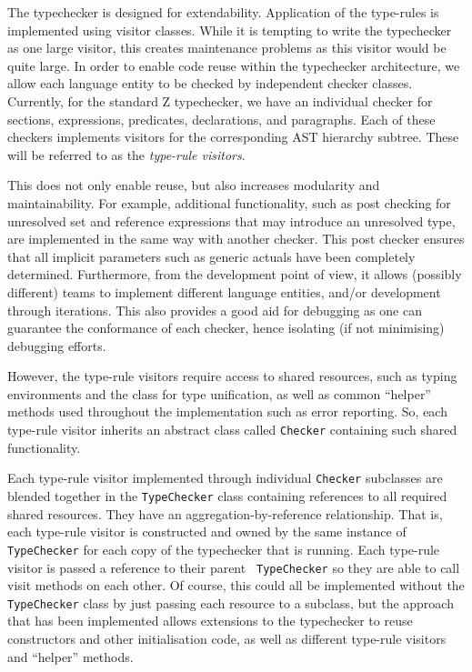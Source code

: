 \documentclass{llncs}
\begin{document}
The typechecker is designed for extendability. Application of the type-rules
is implemented using visitor classes. While it is tempting to
write the typechecker as one large visitor, this creates maintenance
problems as this visitor would be quite large.  In order to enable
code reuse within the typechecker architecture, we allow each language
entity to be checked by independent checker classes.  Currently, for
the standard Z typechecker, we have an individual checker for
sections, expressions, predicates, declarations, and paragraphs. Each
of these checkers implements visitors for the corresponding AST hierarchy
subtree.  These will be referred to as the {\em type-rule visitors}.

This does not only enable reuse, but also increases modularity and
maintainability.  For example, additional functionality, such as post
checking for unresolved set and reference expressions that may
introduce an unresolved type, are implemented in the same way with
another checker. This post checker ensures that all implicit
parameters such as generic actuals have been completely determined.
Furthermore, from the development point of view, it allows (possibly
different) teams to implement different language entities, and/or
development through iterations.  This also provides a good aid for
debugging as one can guarantee the conformance of each checker, hence
isolating (if not minimising) debugging efforts.

However, the type-rule visitors require access to shared resources,
such as typing environments and the class for type unification, as
well as common ``helper'' methods used throughout the implementation
such as error reporting.  So, each type-rule visitor inherits an
abstract class called {\tt Checker} containing such shared
functionality.

Each type-rule visitor implemented through individual {\tt Checker}
subclasses are blended together in the {\tt TypeChecker} class
containing references to all required shared resources. They have an
aggregation-by-reference relationship.  That is, each type-rule
visitor is constructed and owned by the same instance of {\tt
TypeChecker} for each copy of the typechecker that is running.  Each
type-rule visitor is passed a reference to their parent {\tt
TypeChecker} so they are able to call visit methods on each other.  Of
course, this could all be implemented without the {\tt TypeChecker}
class by just passing each resource to a subclass, but the approach
that has been implemented allows extensions to the typechecker to
reuse constructors and other initialisation code, as well as different
type-rule visitors and ``helper'' methods.
\end{document}
